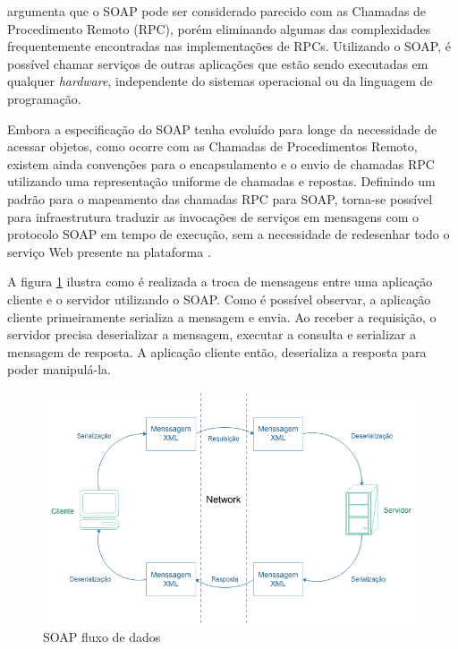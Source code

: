  argumenta que o SOAP pode ser considerado parecido com as Chamadas de Procedimento Remoto (RPC), porém eliminando algumas das complexidades frequentemente encontradas nas implementações de RPCs. Utilizando o SOAP, é possível chamar serviços de outras aplicações que estão sendo executadas em qualquer \textit{hardware}, independente do sistemas operacional ou da linguagem de programação.

Embora a especificação do SOAP tenha evoluído para longe da necessidade de acessar objetos, como ocorre com as Chamadas de Procedimentos Remoto, existem ainda convenções para o encapsulamento e o envio de chamadas RPC utilizando uma representação uniforme de chamadas e repostas. Definindo um padrão para o mapeamento das chamadas RPC para SOAP, torna-se possível para infraestrutura traduzir as invocações de serviços em mensagens com o protocolo SOAP em tempo de execução, sem a necessidade de redesenhar todo o serviço Web presente na plataforma \cite{soap-microsoft}.

A figura \ref{fig:soap} ilustra como é realizada a troca de mensagens entre uma aplicação cliente e o servidor utilizando o SOAP. Como é possível observar, a aplicação cliente primeiramente serializa a mensagem e envia. Ao receber a requisição, o servidor precisa deserializar a mensagem, executar a consulta e serializar a mensagem de resposta. A aplicação cliente então, deserializa a resposta para poder manipulá-la.

\begin{figure}[htbp]
\centering
\includegraphics[width=1\textwidth]{figuras/soap.png}
\caption{SOAP fluxo de dados}
\label{fig:soap}
\author{https://msdn.microsoft.com/en-us/library/x05s00wz(v=vs.80).aspx}
\end{figure}


